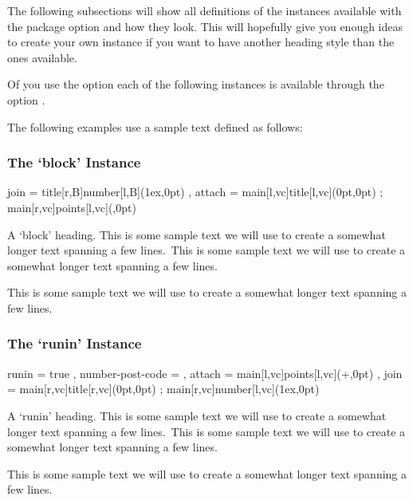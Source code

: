 \documentclass[DIV10,toc=index,toc=bib,numbers=noendperiod]{cnpkgdoc}
\begin{document}
The following subsections will show all definitions of the instances available
with the package option  and how they look.  This will
hopefully give you enough ideas to create your own instance if you want to
have another heading style than the ones available.

Of you use the option  each of the following instances is
available through the option .

The following examples use a sample text defined as follows:
\begin{beispiel}
 \def\s{This is some sample text we will use to create a somewhat
   longer text spanning a few lines.}
 \def\sample{\s\ \s\par\s}
\end{beispiel}
\def\s{This is some sample text we will use to create a somewhat longer text
 spanning a few lines.}
\def\sample{\s\ \s\par\s}

\subsubsection{The `block' Instance}
\begin{beispiel}
  {
    join             = { title[r,B]number[l,B](1ex,0pt) } ,
    attach           =
      {
        main[l,vc]title[l,vc](0pt,0pt) ;
        main[r,vc]points[l,vc](\marginparsep,0pt)
      }
  }
\end{beispiel}
\begin{question}{1}
 A `block' heading. \sample
\end{question}

\subsubsection{The `runin' Instance}
\begin{beispiel}
  {
    runin            = true ,
    number-post-code = \space ,
    attach           =
      { main[l,vc]points[l,vc](\linewidth+\marginparsep,0pt) } ,
    join             =
      {
        main[r,vc]title[r,vc](0pt,0pt) ;
        main[r,vc]number[l,vc](1ex,0pt)
      }
  }
\end{beispiel}
\begin{question}{1}
 A `runin' heading. \sample
\end{question}
\end{document}
